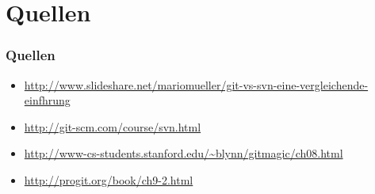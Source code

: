 \section*{Quellen}
\begin{frame}
  \frametitle{Quellen}
  \sloppy
  \begin{itemize}
    \item \url{http://www.slideshare.net/mariomueller/git-vs-svn-eine-vergleichende-einfhrung}
    \item \url{http://git-scm.com/course/svn.html}
    \item \url{http://www-cs-students.stanford.edu/~blynn/gitmagic/ch08.html}
    \item \url{http://progit.org/book/ch9-2.html}
  \end{itemize}
\end{frame}
